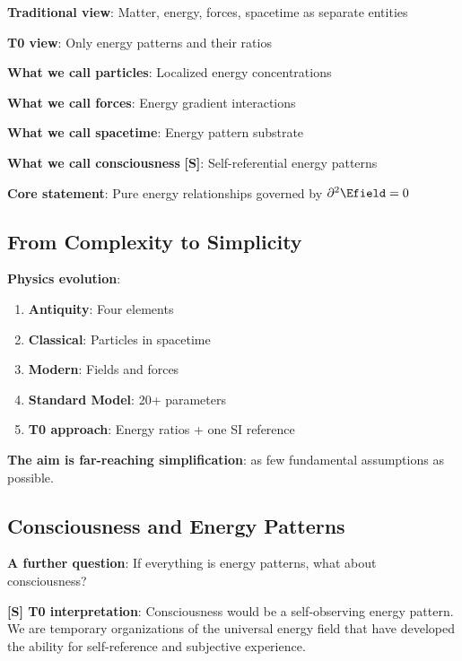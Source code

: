 	\begin{tcolorbox}[colback=purple!5!white,colframe=purple!75!black,title=Dematerialized Description]
		\textbf{Traditional view}: Matter, energy, forces, spacetime as separate entities
		
		\textbf{T0 view}: Only energy patterns and their ratios
		
		\textbf{What we call particles}: Localized energy concentrations
		
		\textbf{What we call forces}: Energy gradient interactions
		
		\textbf{What we call spacetime}: Energy pattern substrate
		
		\textbf{What we call consciousness} \textbf{[S]}: Self-referential energy patterns
		
		\textbf{Core statement}: Pure energy relationships governed by $\partial^2 \Efield = 0$
	\end{tcolorbox}
	
	\subsection{From Complexity to Simplicity}
	
	\textbf{Physics evolution}:
	\begin{enumerate}
		\item \textbf{Antiquity}: Four elements
		\item \textbf{Classical}: Particles in spacetime
		\item \textbf{Modern}: Fields and forces
		\item \textbf{Standard Model}: 20+ parameters
		\item \textbf{T0 approach}: Energy ratios + one SI reference
	\end{enumerate}
	
	\textbf{The aim is far-reaching simplification}: as few fundamental assumptions as possible.
	
	\subsection{Consciousness and Energy Patterns}
	
	\textbf{A further question}: If everything is energy patterns, what about consciousness?
	
	\textbf{[S] T0 interpretation}: Consciousness would be a self-observing energy pattern. We are temporary organizations of the universal energy field that have developed the ability for self-reference and subjective experience.
	

